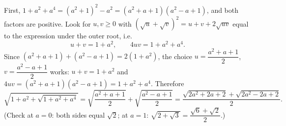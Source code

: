 First, $1+a^2+a^4=(a^2+1)^2-a^2=(a^2+a+1)(a^2-a+1)$, and both factors are positive. Look for $u,v\ge0$ with $(\sqrt u+\sqrt v)^2=u+v+2\sqrt{uv}$ equal to the expression under the outer root, i.e.
\[
u+v=1+a^2,\qquad 4uv=1+a^2+a^4 .
\]
Since $(a^2+a+1)+(a^2-a+1)=2(1+a^2)$, the choice $u=\dfrac{a^2+a+1}{2}$, $v=\dfrac{a^2-a+1}{2}$ works: $u+v=1+a^2$ and $4uv=(a^2+a+1)(a^2-a+1)=1+a^2+a^4$. Therefore
\[
\sqrt{1+a^2+\sqrt{1+a^2+a^4}}=\sqrt{\dfrac{a^2+a+1}{2}}+\sqrt{\dfrac{a^2-a+1}{2}}=\boxed{\dfrac{\sqrt{2a^2+2a+2}+\sqrt{2a^2-2a+2}}{2}}.
\]
(Check at $a=0$: both sides equal $\sqrt2$; at $a=1$: $\sqrt{2+\sqrt3}=\dfrac{\sqrt6+\sqrt2}{2}$.)
